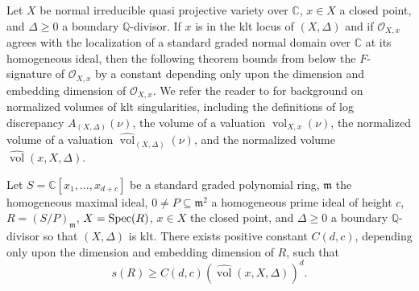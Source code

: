 \documentclass[12pt]{amsart}
\numberwithin{equation}{theorem}
\theoremstyle{plain}
\DeclareMathOperator{\vol}{vol}
\newcommand{\fm}{\mathfrak{m}}
\newcommand{\QQ}{\mathbb{Q}}
\newcommand{\CC}{\mathbb{C}}
\begin{document}
Let $X$ be normal irreducible quasi projective variety over $\CC$, $x\in X$ a closed point, and $\Delta\geq 0$ a boundary $\QQ$-divisor. If $x$ is in the klt locus of $(X,\Delta)$ and if $\mathcal{O}_{X,x}$ agrees with the localization of a standard graded normal domain over $\CC$ at its homogeneous ideal, then the following theorem bounds from below the $F$-signature of $\mathcal{O}_{X,x}$ by a constant depending only upon the dimension and embedding dimension of $\mathcal{O}_{X,x}$. We refer the reader to \cite[Section~2.2]{LiXu2020} for background on normalized volumes of klt singularities, including the definitions of log discrepancy $A_{(X,\Delta)}(\nu)$, the volume of a valuation $\vol_{X,x}(\nu)$, the normalized volume of a valuation $\widehat{\vol}_{(X,\Delta)}(\nu)$, and the normalized volume $\widehat{\vol}(x,X,\Delta)$.

\begin{theorem}
    \label{thm: lower bound of F-sig via normalized volume and embedding dimension}
    Let $S = \CC[x_1,\ldots,x_{d+c}]$ be a standard graded polynomial ring, $\fm$ the homogeneous maximal ideal, $0\not=P\subseteq \fm^2$ a homogeneous prime ideal of height $c$, $R = (S/P)_{\fm}$, $X = \operatorname{{Spec}}(R)$, $x\in X$ the closed point, and $\Delta\geq 0$ a boundary $\QQ$-divisor so that $(X,\Delta)$ is klt. There exists positive constant $C(d,c)$, depending only upon the dimension and embedding dimension of $R$, such that
    \[
    s(R)\geq C(d,c)\left(\widehat{\vol}(x,X,\Delta)\right)^d.
    \]
\end{theorem}
\end{document}
